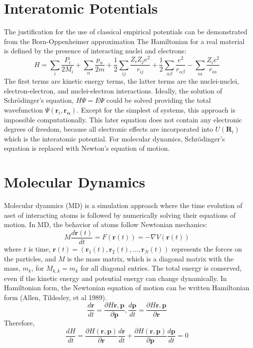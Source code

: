 \section{Interatomic Potentials}
The justification for the use of classical empirical potentials can be demonstrated from the Born-Oppenheimer approximation\cite{born1927_bo}  The Hamiltonian for a real material is defined by the presence of interacting nuclei and electrons:
\begin{equation}
	H = \sum_i \frac{P_i}{2M_i}
	    + \sum_\alpha \frac{p_\alpha}{2m}
	    + \frac{1}{2} \sum_{ij} \frac{Z_i Z_j e^2}{r_{ij}}
	    + \frac{1}{2} \sum_{\alpha\beta} \frac{e^2}{r_{\alpha\beta}}
	    - \sum_{i\alpha} \frac{Z_i e^2}{r_{i\alpha}}
\end{equation}
The first terms are kinetic energy terms, the latter terms are the nuclei-nuclei, electron-electron, and nuclei-electron interactions.  Ideally, the solution of Schr\"{o}dinger's equation, $H\Psi=E\Psi$ could be solved providing the total wavefunction $\Psi(\bm{r}_i,\bm{r_\alpha})$.  Except for the simplest of systems, this approach is impossible computationally.
This later equation does not contain any electronic degrees of freedom, because all electronic effects are incorporated into $U(\bm{R}_i)$ which is the interatomic potential.  For molecular dynamics, Schr\"{o}dinger's equation is replaced with Newton's equation of motion.
\section{Molecular Dynamics}
Molecular dyanmics (MD) is a simulation approach where the time evolution of aset of interacting atoms is followed by numerically solving their equations of motion.  In MD, the behavior of atoms follow Newtonian mechanics:
\begin{equation}
    M\frac{d\bm{r}(t)}{dt} = F(\bm{r}(t))=-\nabla V(\bm{r}(t))
\end{equation}
where $t$ is time, $\bm{r}(t) = (\bm{r}_1(t),\bm{r}_2(t),...,\bm{r}_N(t))$ represents the forces on the particles, and $M$ is the mass matrix, which is a diagonal matrix with the mass, $m_k$, for $M_{k,k}=m_k$ for all diagonal entries.
The total energy is conserved, even if the kinetic energy and potential energy can change dynamically.  In Hamiltonian form, the Newtonian equation of motion can be written Hamiltonian form (Allen, Tildesley, et al 1989).
\begin{equation}
	\frac{d \bm{r}}{dt}=\frac{\partial H{\bm{r},\bm{p}}}{\partial \bm{p}},
	\frac{d \bm{p}}{dt}=\frac{\partial H{\bm{r},\bm{p}}}{\partial \bm{r}}
\end{equation}
Therefore,
\begin{equation}
	\frac{dH}{dt}=\frac{\partial H(\bm{r},\bm{p})}{\partial \bm{r}} \frac{d\bm{r}}{dt}
						   +\frac{\partial H(\bm{r},\bm{p})}{\partial \bm{p}} \frac{d\bm{p}}{dt} = 0
\end{equation}

